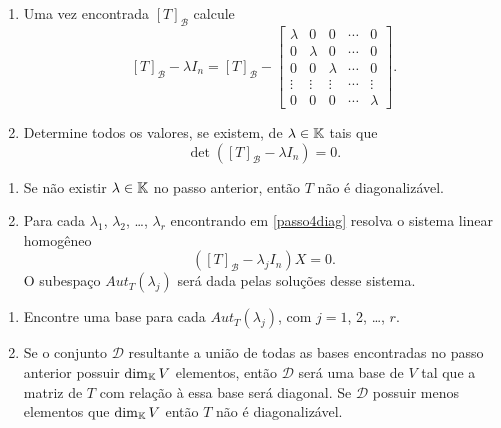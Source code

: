 \documentclass{beamer}
\begin{document}
    \begin{frame}
        \begin{enumerate}[label={\arabic*})]
            \conti
            \item Uma vez encontrada $[T]_\mathcal{B}$ calcule
            \[
            [T]_\mathcal{B} - \lambda I_n = [T]_\mathcal{B} - \begin{bmatrix}\lambda & 0 & 0 & \cdots & 0\\0 & \lambda & 0 & \cdots & 0\\0 & 0 & \lambda & \cdots & 0\\\vdots & \vdots & \vdots & \cdots & \vdots\\0 & 0 & 0 & \cdots & \lambda\end{bmatrix}.
            \]

            \item\label{passo4diag} Determine todos os valores, se existem, de $\lambda \in \mathbb{K}$ tais que
            \[
            \det([T]_\mathcal{B} - \lambda I_n) = 0.
            \]
            \seti
        \end{enumerate}
    \end{frame}

    \begin{frame}
        \begin{enumerate}[label={\arabic*})]
            \conti
            \item Se não existir $\lambda \in \mathbb{K}$ no passo anterior, então $T$ não é diagonalizável.

            \item Para cada $\lambda_1$, $\lambda_2$, \dots, $\lambda_r$ encontrando em \ref{passo4diag} resolva o sistema linear homogêneo
            \[
            ([T]_\mathcal{B} - \lambda_jI_n)X = 0.
            \]
            O subespaço $Aut_T(\lambda_j)$ será dada pelas soluções desse sistema.
            \seti
        \end{enumerate}
    \end{frame}

\begin{frame}
        \begin{enumerate}[label={\arabic*})]
        \conti
            \item Encontre uma base para cada $Aut_T(\lambda_j)$, com $j = 1$, 2, \dots, $r$.

            \item Se o conjunto $\mathcal{D}$ resultante a união de todas as bases encontradas no passo anterior possuir $\dim_{\mathbb{K}}V$ elementos, então $\mathcal{D}$ será uma base de $V$ tal que a matriz de $T$ com relação à essa base será diagonal. Se $\mathcal{D}$ possuir menos elementos que $\dim_{\mathbb{K}}V$ então $T$ não é diagonalizável.
        \end{enumerate}
    \end{frame}
\end{document}
